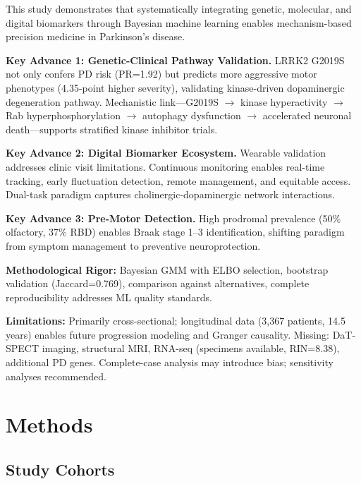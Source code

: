 \documentclass[11pt]{article}
\begin{document}
This study demonstrates that systematically integrating genetic, molecular, and digital biomarkers through Bayesian machine learning enables mechanism-based precision medicine in Parkinson's disease.

\textbf{Key Advance 1: Genetic-Clinical Pathway Validation.} LRRK2 G2019S not only confers PD risk (PR=1.92) but predicts more aggressive motor phenotypes (4.35-point higher severity), validating kinase-driven dopaminergic degeneration pathway. Mechanistic link—G2019S $\rightarrow$ kinase hyperactivity $\rightarrow$ Rab hyperphosphorylation $\rightarrow$ autophagy dysfunction $\rightarrow$ accelerated neuronal death\cite{west2023lrrk2,steger2016phosphoproteomics}—supports stratified kinase inhibitor trials\cite{simuni2024lrrk2}.

\textbf{Key Advance 2: Digital Biomarker Ecosystem.} Wearable validation addresses clinic visit limitations\cite{mirelman2024wearable,adams2024using}. Continuous monitoring enables real-time tracking, early fluctuation detection, remote management, and equitable access. Dual-task paradigm captures cholinergic-dopaminergic network interactions\cite{bohnen2013cholinergic,raffegeau2019meta}.

\textbf{Key Advance 3: Pre-Motor Detection.} High prodromal prevalence (50\% olfactory, 37\% RBD) enables Braak stage 1--3 identification\cite{braak2003staging,mahlknecht2022prodromal}, shifting paradigm from symptom management to preventive neuroprotection.

\textbf{Methodological Rigor:} Bayesian GMM with ELBO selection, bootstrap validation (Jaccard=0.769), comparison against alternatives, complete reproducibility addresses ML quality standards\cite{zhang2023machine,collins2024tripod}.

\textbf{Limitations:} Primarily cross-sectional; longitudinal data (3,367 patients, 14.5 years) enables future progression modeling and Granger causality. Missing: DaT-SPECT imaging, structural MRI, RNA-seq (specimens available, RIN=8.38), additional PD genes\cite{nalls2019identification}. Complete-case analysis may introduce bias; sensitivity analyses recommended.

\section{Methods}

\subsection{Study Cohorts}
\end{document}
